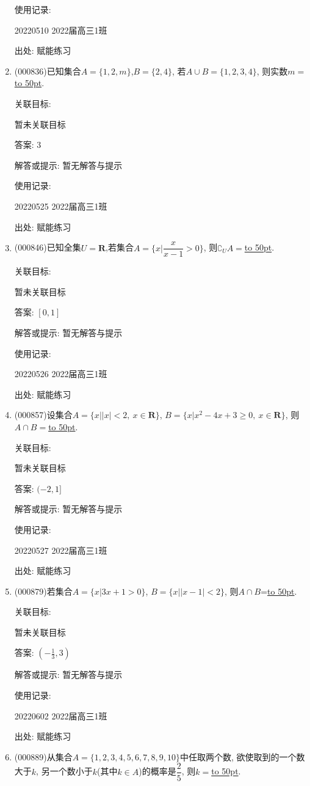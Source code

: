 \documentclass[10pt,a4paper]{article}
\newcommand{\blank}[1]{\underline{\hbox to #1pt{}}}
\begin{document}
\begin{enumerate}[1.]
使用记录:

20220510	2022届高三1班	


出处: 赋能练习
\item { (000836)}已知集合$A=\{1,2,m\}$,$B=\{2,4\}$, 若$A\cup B=\{1,2,3,4\}$, 则实数$m=$\blank{50}.


关联目标:

暂未关联目标

答案: $3$

解答或提示: 暂无解答与提示

使用记录:

20220525	2022届高三1班	


出处: 赋能练习
\item { (000846)}已知全集$U=\mathbf{R}$,若集合$A=\{x|\dfrac x{x-1}>0\}$, 则$\complement_U A=$\blank{50}.


关联目标:

暂未关联目标

答案: $[0,1]$

解答或提示: 暂无解答与提示

使用记录:

20220526	2022届高三1班	


出处: 赋能练习
\item { (000857)}设集合$A=\{x||x|<2,\ x\in \mathbf{R}\}$, $B=\{x|x^2-4x+3\ge 0, \ x\in \mathbf{R}\}$, 则$A\cap B=$\blank{50}.


关联目标:

暂未关联目标

答案: $(-2,1]$

解答或提示: 暂无解答与提示

使用记录:

20220527	2022届高三1班	


出处: 赋能练习
\item { (000879)}若集合$A=\{x|3x+1>0\}$, $B=\{x||x-1|<2\}$, 则$A\cap B$=\blank{50}.


关联目标:

暂未关联目标

答案: $(-\frac 13,3)$

解答或提示: 暂无解答与提示

使用记录:

20220602	2022届高三1班	


出处: 赋能练习
\item { (000889)}从集合$A=\{1,2,3,4,5,6,7,8,9,10\}$中任取两个数, 欲使取到的一个数大于$k$, 另一个数小于$k$(其中$k\in A$)的概率是$\dfrac25$, 则$k=$\blank{50}.



\end{enumerate}
\end{document}
